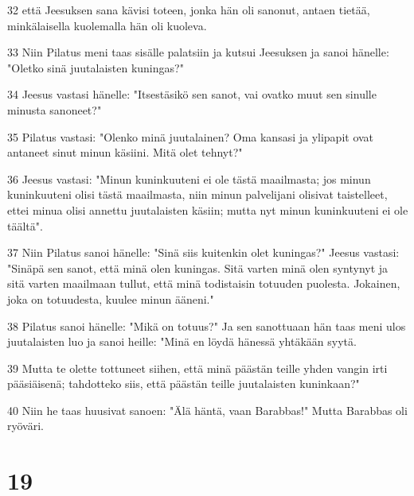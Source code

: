 \par 32 että Jeesuksen sana kävisi toteen, jonka hän oli sanonut, antaen tietää, minkälaisella kuolemalla hän oli kuoleva.
\par 33 Niin Pilatus meni taas sisälle palatsiin ja kutsui Jeesuksen ja sanoi hänelle: "Oletko sinä juutalaisten kuningas?"
\par 34 Jeesus vastasi hänelle: "Itsestäsikö sen sanot, vai ovatko muut sen sinulle minusta sanoneet?"
\par 35 Pilatus vastasi: "Olenko minä juutalainen? Oma kansasi ja ylipapit ovat antaneet sinut minun käsiini. Mitä olet tehnyt?"
\par 36 Jeesus vastasi: "Minun kuninkuuteni ei ole tästä maailmasta; jos minun kuninkuuteni olisi tästä maailmasta, niin minun palvelijani olisivat taistelleet, ettei minua olisi annettu juutalaisten käsiin; mutta nyt minun kuninkuuteni ei ole täältä".
\par 37 Niin Pilatus sanoi hänelle: "Sinä siis kuitenkin olet kuningas?" Jeesus vastasi: "Sinäpä sen sanot, että minä olen kuningas. Sitä varten minä olen syntynyt ja sitä varten maailmaan tullut, että minä todistaisin totuuden puolesta. Jokainen, joka on totuudesta, kuulee minun ääneni."
\par 38 Pilatus sanoi hänelle: "Mikä on totuus?" Ja sen sanottuaan hän taas meni ulos juutalaisten luo ja sanoi heille: "Minä en löydä hänessä yhtäkään syytä.
\par 39 Mutta te olette tottuneet siihen, että minä päästän teille yhden vangin irti pääsiäisenä; tahdotteko siis, että päästän teille juutalaisten kuninkaan?"
\par 40 Niin he taas huusivat sanoen: "Älä häntä, vaan Barabbas!" Mutta Barabbas oli ryöväri.

\chapter{19}

